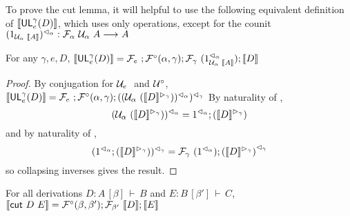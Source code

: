 \documentclass{drl-common/llncs}
\renewcommand{\sem}[1]{\ensuremath{ \llbracket #1 \rrbracket}}
\newcommand{\arrow}[3]{\ensuremath{#2 \longrightarrow_{#1} #3}}
\newcommand\seq[3]{\ensuremath{#1 \, [ #2 ] \, \vdash \, #3}}
\newcommand\cutsym{\ensuremath{\dsd{cut}}}
\newcommand\cut[2]{\ensuremath{{\cutsym \,\, #1 \,\, #2}}}
\newcommand\UL[3]{\ensuremath{\dsd{UL}^{#1}_{#2}(#3)}}
\begin{document}
To prove the cut lemma, it will helpful to use the following equivalent
definition of \sem{\UL{\gamma}{e}{D}}, which uses only \semF{}{}
operations, except for the counit
$\semrtol{(1_{\semU{\alpha}{\sem{A}}})}{\alpha} :
\arrow{}{\semF{\alpha}{\semU{\alpha}{A}}}{A}$

\begin{lemma}\label{lem:semulalt}
For any $\gamma,e,D$, 
$\sem{\UL \gamma e D}  = \semF{e};\semFcomp(\alpha,\gamma);\semF{\gamma}{(\semrtol{1_{\semU{\alpha}{\sem{A}}}}{\alpha})};\sem{D}$
\end{lemma}

\begin{proof}
By conjugation for $\semU{e}$ and $\mathcal{U}^\circ$, $\sem{\UL \gamma e D} = 
\semF{e};\semFcomp(\alpha,\gamma);\semrtol{(\semrtol{(\semU{\alpha}{(\semltor{\sem{D}}{\gamma})})}{\alpha})}{\gamma}$
By naturality of \semrtol{-}{\alpha},
\[
{\semrtol{(\semU{\alpha}{(\semltor{\sem{D}}{\gamma})})}{\alpha}} = 
\semrtol{1}{\alpha};{{(\semltor{\sem{D}}{\gamma})}} 
\]
and by naturality of \semrtol{-}{\gamma},
\[
\semrtol{(\semrtol{1}{\alpha};{{(\semltor{\sem{D}}{\gamma})}})}{\gamma}
= \semF{\gamma}{(\semrtol{1}{\alpha})};\semrtol{{{(\semltor{\sem{D}}{\gamma})}}}{\gamma}
\]
so collapsing inverses gives the result.  
\end{proof}

\begin{lemma}\label{lem:semcut}
For all derivations $D : \seq{A}{\beta}{B}$ and $E : \seq{B}{\beta'}{C}$, $\sem{\cut D E} = {\semFcomp(\beta,\beta')};{\semF{\beta'}{\sem{D}}};{\sem{E}}$
\end{lemma}

\newcommand{\semofcut}[2]{{\semFcomp(\beta,\beta')};{\semF{\beta'}{\sem{#1}}};{\sem{#2}}}
\end{document}
